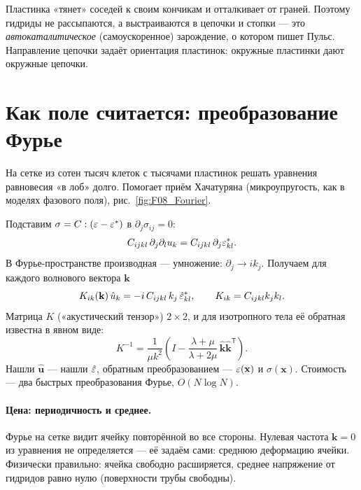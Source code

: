 \begin{idea}
Пластинка «тянет» соседей к своим кончикам и отталкивает от граней. Поэтому гидриды не
рассыпаются, а выстраиваются в цепочки и стопки --- это \emph{автокаталитическое}
(самоускоренное) зарождение, о котором пишет Пульс. Направление цепочки задаёт ориентация
пластинок: окружные пластинки дают окружные цепочки.
\end{idea}

\section{Как поле считается: преобразование Фурье}

На сетке из сотен тысяч клеток с тысячами пластинок решать уравнения равновесия «в лоб» долго.
Помогает приём Хачатуряна (микроупругость, как в моделях фазового поля), рис.~\ref{fig:F08_Fourier}.


Подставим $\sigma=C:(\varepsilon-\varepsilon^*)$ в $\partial_j\sigma_{ij}=0$:
\[
C_{ijkl}\,\partial_j\partial_l u_k=C_{ijkl}\,\partial_j\varepsilon^*_{kl}.
\]
В Фурье-пространстве производная --- умножение: $\partial_j\to ik_j$. Получаем для каждого
волнового вектора $\mathbf k$
\begin{equation}
K_{ik}(\mathbf k)\,\hat u_k=-i\,C_{ijkl}\,k_j\,\hat{\varepsilon}^*_{kl},\qquad K_{ik}=C_{ijkl}k_jk_l .
\end{equation}
Матрица $K$ («акустический тензор») $2\times2$, и для изотропного тела её обратная известна
в явном виде:
\begin{equation}
K^{-1}=\frac{1}{\mu k^2}\left(I-\frac{\lambda+\mu}{\lambda+2\mu}\,\hat{\mathbf k}\hat{\mathbf k}^{\mathsf T}\right).
\end{equation}
Нашли $\hat{\mathbf u}$ --- нашли $\hat{\varepsilon}$, обратным преобразованием --- $\varepsilon(\mathbf x)$ и
$\sigma(\mathbf x)$. Стоимость --- два быстрых преобразования Фурье, $O(N\log N)$.

\paragraph{Цена: периодичность и среднее.} Фурье на сетке видит ячейку повторённой во все
стороны. Нулевая частота $\mathbf k=0$ из уравнения не определяется --- её задаём сами: среднюю
деформацию ячейки. Физически правильно: ячейка свободно расширяется, среднее напряжение от
гидридов равно нулю (поверхности трубы свободны).

